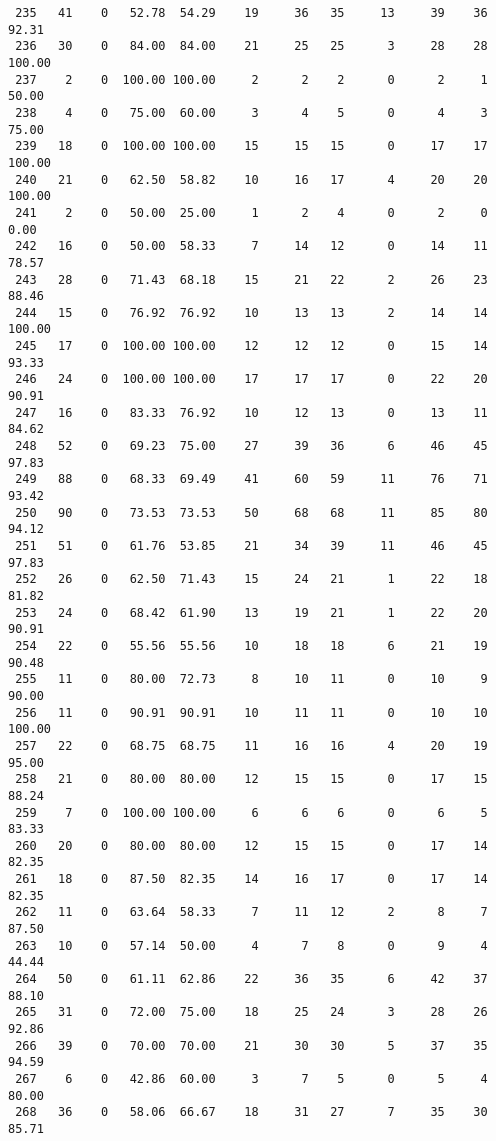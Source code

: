 \begin{verbatim}
 235   41    0   52.78  54.29    19     36   35     13     39    36    92.31
 236   30    0   84.00  84.00    21     25   25      3     28    28   100.00
 237    2    0  100.00 100.00     2      2    2      0      2     1    50.00
 238    4    0   75.00  60.00     3      4    5      0      4     3    75.00
 239   18    0  100.00 100.00    15     15   15      0     17    17   100.00
 240   21    0   62.50  58.82    10     16   17      4     20    20   100.00
 241    2    0   50.00  25.00     1      2    4      0      2     0     0.00
 242   16    0   50.00  58.33     7     14   12      0     14    11    78.57
 243   28    0   71.43  68.18    15     21   22      2     26    23    88.46
 244   15    0   76.92  76.92    10     13   13      2     14    14   100.00
 245   17    0  100.00 100.00    12     12   12      0     15    14    93.33
 246   24    0  100.00 100.00    17     17   17      0     22    20    90.91
 247   16    0   83.33  76.92    10     12   13      0     13    11    84.62
 248   52    0   69.23  75.00    27     39   36      6     46    45    97.83
 249   88    0   68.33  69.49    41     60   59     11     76    71    93.42
 250   90    0   73.53  73.53    50     68   68     11     85    80    94.12
 251   51    0   61.76  53.85    21     34   39     11     46    45    97.83
 252   26    0   62.50  71.43    15     24   21      1     22    18    81.82
 253   24    0   68.42  61.90    13     19   21      1     22    20    90.91
 254   22    0   55.56  55.56    10     18   18      6     21    19    90.48
 255   11    0   80.00  72.73     8     10   11      0     10     9    90.00
 256   11    0   90.91  90.91    10     11   11      0     10    10   100.00
 257   22    0   68.75  68.75    11     16   16      4     20    19    95.00
 258   21    0   80.00  80.00    12     15   15      0     17    15    88.24
 259    7    0  100.00 100.00     6      6    6      0      6     5    83.33
 260   20    0   80.00  80.00    12     15   15      0     17    14    82.35
 261   18    0   87.50  82.35    14     16   17      0     17    14    82.35
 262   11    0   63.64  58.33     7     11   12      2      8     7    87.50
 263   10    0   57.14  50.00     4      7    8      0      9     4    44.44
 264   50    0   61.11  62.86    22     36   35      6     42    37    88.10
 265   31    0   72.00  75.00    18     25   24      3     28    26    92.86
 266   39    0   70.00  70.00    21     30   30      5     37    35    94.59
 267    6    0   42.86  60.00     3      7    5      0      5     4    80.00
 268   36    0   58.06  66.67    18     31   27      7     35    30    85.71

\end{verbatim}
